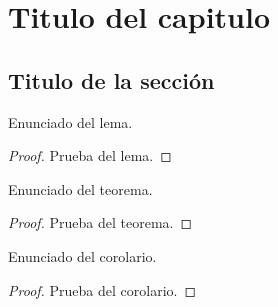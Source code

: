 \chapter{Titulo del capitulo}  \label{cap1}

\section{Titulo de la sección} \label{cap1:sec1}

\begin{lemma} \label{lema1}
    Enunciado del lema.
\end{lemma}

\begin{proof}
    Prueba del lema.
\end{proof}

\begin{theorem} \label{teorema1}
    Enunciado del teorema.
\end{theorem}

\begin{proof}
    Prueba del teorema.
\end{proof}

\begin{corollary} \label{corolario1}
    Enunciado del corolario.
\end{corollary}

\begin{proof}
    Prueba del corolario.
\end{proof}